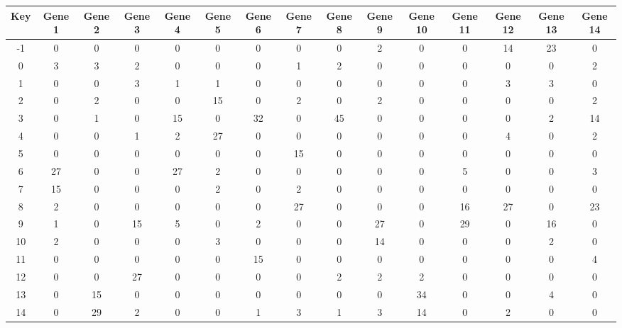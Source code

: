 \begin{tabular}{|c|c|c|c|c|c|c|c|c|c|c|c|c|c|c|}
\hline
Key & Gene 1 & Gene 2 & Gene 3 & Gene 4 & Gene 5 & Gene 6 & Gene 7 & Gene 8 & Gene 9 & Gene 10 & Gene 11 & Gene 12 & Gene 13 & Gene 14 \\
\hline
-1 & 0 & 0 & 0 & 0 & 0 & 0 & 0 & 0 & 2 & 0 & 0 & 14 & 23 & 0 \\
0 & 3 & 3 & 2 & 0 & 0 & 0 & 1 & 2 & 0 & 0 & 0 & 0 & 0 & 2 \\
1 & 0 & 0 & 3 & 1 & 1 & 0 & 0 & 0 & 0 & 0 & 0 & 3 & 3 & 0 \\
2 & 0 & 2 & 0 & 0 & 15 & 0 & 2 & 0 & 2 & 0 & 0 & 0 & 0 & 2 \\
3 & 0 & 1 & 0 & 15 & 0 & 32 & 0 & 45 & 0 & 0 & 0 & 0 & 2 & 14 \\
4 & 0 & 0 & 1 & 2 & 27 & 0 & 0 & 0 & 0 & 0 & 0 & 4 & 0 & 2 \\
5 & 0 & 0 & 0 & 0 & 0 & 0 & 15 & 0 & 0 & 0 & 0 & 0 & 0 & 0 \\
6 & 27 & 0 & 0 & 27 & 2 & 0 & 0 & 0 & 0 & 0 & 5 & 0 & 0 & 3 \\
7 & 15 & 0 & 0 & 0 & 2 & 0 & 2 & 0 & 0 & 0 & 0 & 0 & 0 & 0 \\
8 & 2 & 0 & 0 & 0 & 0 & 0 & 27 & 0 & 0 & 0 & 16 & 27 & 0 & 23 \\
9 & 1 & 0 & 15 & 5 & 0 & 2 & 0 & 0 & 27 & 0 & 29 & 0 & 16 & 0 \\
10 & 2 & 0 & 0 & 0 & 3 & 0 & 0 & 0 & 14 & 0 & 0 & 0 & 2 & 0 \\
11 & 0 & 0 & 0 & 0 & 0 & 15 & 0 & 0 & 0 & 0 & 0 & 0 & 0 & 4 \\
12 & 0 & 0 & 27 & 0 & 0 & 0 & 0 & 2 & 2 & 2 & 0 & 0 & 0 & 0 \\
13 & 0 & 15 & 0 & 0 & 0 & 0 & 0 & 0 & 0 & 34 & 0 & 0 & 4 & 0 \\
14 & 0 & 29 & 2 & 0 & 0 & 1 & 3 & 1 & 3 & 14 & 0 & 2 & 0 & 0 \\
\hline
\end{tabular}